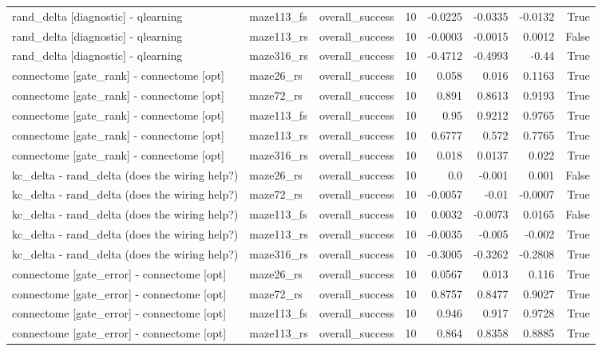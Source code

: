 \begin{table}[t]
\begin{tabular}{lllrrrrr}
rand\_delta [diagnostic] - qlearning & maze113\_fs & overall\_success & 10 & -0.0225 & -0.0335 & -0.0132 & True \\
rand\_delta [diagnostic] - qlearning & maze113\_rs & overall\_success & 10 & -0.0003 & -0.0015 & 0.0012 & False \\
rand\_delta [diagnostic] - qlearning & maze316\_rs & overall\_success & 10 & -0.4712 & -0.4993 & -0.44 & True \\
connectome [gate\_rank] - connectome [opt] & maze26\_rs & overall\_success & 10 & 0.058 & 0.016 & 0.1163 & True \\
connectome [gate\_rank] - connectome [opt] & maze72\_rs & overall\_success & 10 & 0.891 & 0.8613 & 0.9193 & True \\
connectome [gate\_rank] - connectome [opt] & maze113\_fs & overall\_success & 10 & 0.95 & 0.9212 & 0.9765 & True \\
connectome [gate\_rank] - connectome [opt] & maze113\_rs & overall\_success & 10 & 0.6777 & 0.572 & 0.7765 & True \\
connectome [gate\_rank] - connectome [opt] & maze316\_rs & overall\_success & 10 & 0.018 & 0.0137 & 0.022 & True \\
kc\_delta - rand\_delta (does the wiring help?) & maze26\_rs & overall\_success & 10 & 0.0 & -0.001 & 0.001 & False \\
kc\_delta - rand\_delta (does the wiring help?) & maze72\_rs & overall\_success & 10 & -0.0057 & -0.01 & -0.0007 & True \\
kc\_delta - rand\_delta (does the wiring help?) & maze113\_fs & overall\_success & 10 & 0.0032 & -0.0073 & 0.0165 & False \\
kc\_delta - rand\_delta (does the wiring help?) & maze113\_rs & overall\_success & 10 & -0.0035 & -0.005 & -0.002 & True \\
kc\_delta - rand\_delta (does the wiring help?) & maze316\_rs & overall\_success & 10 & -0.3005 & -0.3262 & -0.2808 & True \\
connectome [gate\_error] - connectome [opt] & maze26\_rs & overall\_success & 10 & 0.0567 & 0.013 & 0.116 & True \\
connectome [gate\_error] - connectome [opt] & maze72\_rs & overall\_success & 10 & 0.8757 & 0.8477 & 0.9027 & True \\
connectome [gate\_error] - connectome [opt] & maze113\_fs & overall\_success & 10 & 0.946 & 0.917 & 0.9728 & True \\
connectome [gate\_error] - connectome [opt] & maze113\_rs & overall\_success & 10 & 0.864 & 0.8358 & 0.8885 & True \\

\end{tabular}
\end{table}
